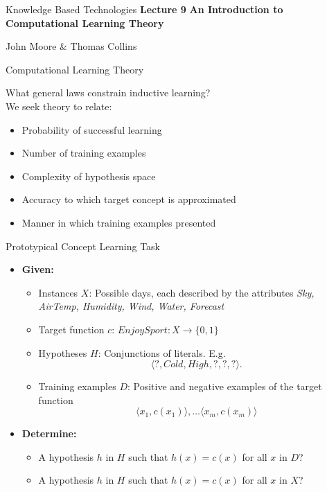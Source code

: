 \documentclass[%
pdf,
colorBG,
slideColor,
tcrico,
]{prosper}
\begin{document}
\begin{slide}{Knowledge Based Technologies}
	\textbf{Lecture 9} 
	\newline
	\textbf{An Introduction to Computational Learning Theory}

	\small
	John Moore \& Thomas Collins
\end{slide}



\begin{slide}{Computational Learning Theory }

What general laws constrain inductive learning?
\\

We seek theory to relate:
\begin{itemize}
	\item Probability of successful learning
	\item Number of training examples
	\item Complexity of hypothesis space
	\item Accuracy to which target concept is approximated
	\item Manner in which training examples presented
\end{itemize}
\end{slide}


\begin{slide}{Prototypical Concept Learning Task }
\tiny 
\begin{itemize} 
\item  {\bf Given:} 
	\begin{itemize}
	\item Instances $X$: Possible days, each described by the attributes {\em Sky, AirTemp, Humidity, Wind, Water, Forecast}
	\item Target function $c$: $EnjoySport: X \rightarrow \{0,1 \}$
 	\item Hypotheses $H$: Conjunctions of literals. E.g.\[\langle ?, Cold, High, ?, ?, ? \rangle. \]
	\item Training examples $D$: Positive and negative examples of the target function 
\[\langle x_1, c(x_1) \rangle , \ldots \langle x_m, c(x_m) \rangle\]
	\end{itemize}
\item {\bf Determine:}
	\begin{itemize}
	\item A hypothesis $h$ in $H$ such that $h(x)=c(x)$ for all $x$ in $D$?
	\item A hypothesis $h$ in $H$ such that $h(x)=c(x)$ for all $x$ in $X$?
	\end{itemize}
\end{itemize}
\end{slide}
\end{document}
